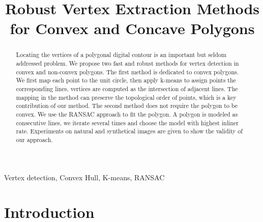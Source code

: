 \documentclass{article}
\title{Robust Vertex Extraction Methods for Convex and Concave Polygons}
\begin{document}
%
\maketitle
%
\begin{abstract}

Locating the vertices of a polygonal digital contour is an important but seldom addressed problem.
We propose two fast and robust methods for vertex detection in convex and non-convex polygons.
The first method is dedicated to convex polygons. We first map each point to the unit circle, then apply
k-means to assign points the corresponding lines, vertices are computed as the intersection of adjacent lines.
The mapping in the method can preserve the topological order of points, which is a key contribution of our method.
The second method does not require the polygon to be convex. We use the RANSAC approach to fit the polygon. A polygon
is modeled as consecutive lines, we iterate several times and choose the model with highest inliner rate. 
Experiments on natural and synthetical images are given to show the validity of our approach.

\end{abstract}
%
\begin{keywords}
  Vertex detection, Convex Hull, K-means, RANSAC
\end{keywords}
%
\section{Introduction}
\label{sec:intro}

\end{document}
